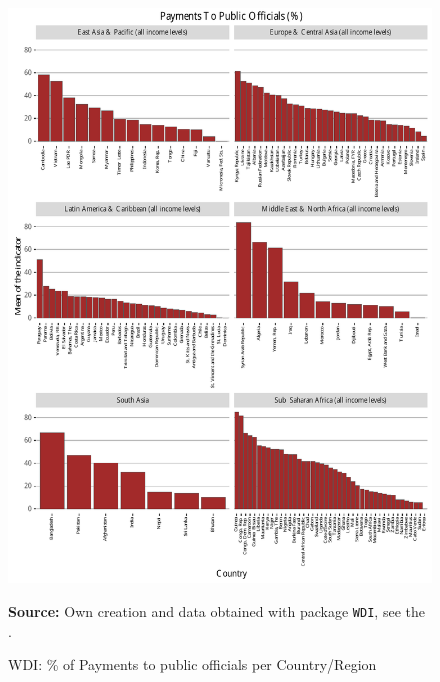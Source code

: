 \begin{figure}[H]
\begin{center}
\caption{WDI: \% of Payments to public officials per Country/Region}
\label{fig_wdi_pays}
\includegraphics[max height=.9\textheight]{../img/wdi_payments_to_public_officials_perc.pdf}
\end{center}
\noindent \footnotesize{\textbf{Source:} Own creation and data obtained with package \texttt{WDI}, see the \cite{wb_r}.}
\end{figure}


